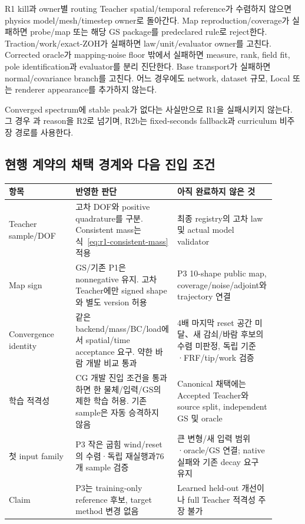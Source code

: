 \documentclass[10pt]{article}
\begin{document}
\begin{stopbox}{R1 kill과 owner별 routing}
Teacher spatial/temporal reference가 수렴하지 않으면 physics model/mesh/timestep owner로 돌아간다.
Map reproduction/coverage가 실패하면 probe/map 또는 해당 GS package를 predeclared rule로 reject한다.
Traction/work/exact-ZOH가 실패하면 law/unit/evaluator owner를 고친다.
Corrected oracle가 mapping-noise floor 밖에서 실패하면 measure, rank, field fit, pole identification과 evaluator를
분리 진단한다. Base transport가 실패하면 normal/covariance branch를 고친다.
어느 경우에도 network, dataset 규모, Local 또는 renderer appearance를 추가하지 않는다.
\end{stopbox}

Converged spectrum에 stable peak가 없다는 사실만으로 R1을 실패시키지 않는다.
그 경우 과 reason을 R2로 넘기며, R2b는 fixed-seconds fallback과
curriculum 비주장 경로를 사용한다.

\subsection{현행 계약의 채택 경계와 다음 진입 조건}

\begin{longtable}{L{0.23\linewidth}L{0.33\linewidth}L{0.34\linewidth}}
\toprule 항목 & 반영한 판단 & 아직 완료하지 않은 것\\\midrule
Teacher sample/DOF & 고차 DOF와 positive quadrature를 구분. Consistent mass는 식~\eqref{eq:r1-consistent-mass} 적용 & 최종 registry의 고차 law 및 actual model validator\\
Map sign & GS/기존 P1은 nonnegative 유지. 고차 Teacher에만 signed shape와 별도 version 허용 & P3 10-shape public map, coverage/noise/adjoint와 trajectory 연결\\
Convergence identity & 같은 backend/mass/BC/load에서 spatial/time acceptance 요구. 약한 바람 개발 비교 통과 & 4배 마지막 reset 공간 미달、새 감쇠/바람 후보의 수렴 미판정, 독립 기준·FRF/tip/work 검증\\
학습 적격성 & CG 개발 진입 조건을 통과하면 한 물체/입력/GS의 제한 학습 허용. 기존 sample은 자동 승격하지 않음 & Canonical 채택에는 Accepted Teacher와 source split, independent GS 및 oracle\\
첫 input family & P3 작은 굽힘 wind/reset의 수렴·독립 재실행과76개 sample 검증 & 큰 변형/새 입력 범위·oracle/GS 연결; native 실패와 기존 decay 요구 유지\\
Claim & P3는 training-only reference 후보, target method 변경 없음 & Learned held-out 개선이나 full Teacher 적격성 주장 불가\\
\bottomrule\end{longtable}
\end{document}
